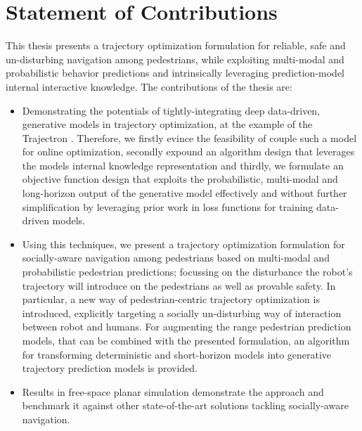 \section{Statement of Contributions}
\label{text:introduction/contributions}
This thesis presents a trajectory optimization formulation for reliable, safe and un-disturbing navigation among pedestrians, while exploiting multi-modal and probabilistic behavior predictions and intrinsically leveraging prediction-model internal interactive knowledge.
\newline\newline
The contributions of the thesis are:

\begin{itemize}
\item Demonstrating the potentials of tightly-integrating deep data-driven, generative models in trajectory optimization, at the example of the Trajectron \cite{Ivanovic2018}\cite{Salzmann2020}. Therefore, we firstly evince the feasibility of couple such a model for online optimization, secondly expound an algorithm design that leverages the models internal knowledge representation and thirdly, we formulate an objective function design that exploits the probabilistic, multi-modal and long-horizon output of the generative model effectively and without further simplification by leveraging prior work in loss functions for training data-driven models.  
\item Using this techniques, we present a trajectory optimization formulation for socially-aware navigation among pedestrians based on multi-modal and probabilistic pedestrian predictions; focussing on the disturbance the robot's trajectory will introduce on the pedestrians as well as provable safety. In particular, a new way of pedestrian-centric trajectory optimization is introduced, explicitly targeting a socially un-disturbing way of interaction between robot and humans. For augmenting the range pedestrian prediction models, that can be combined with the presented formulation, an algorithm for transforming deterministic and short-horizon models into generative trajectory prediction models is provided.
\item Results in free-space planar simulation demonstrate the approach and benchmark it against other state-of-the-art solutions tackling socially-aware navigation.
\end{itemize}